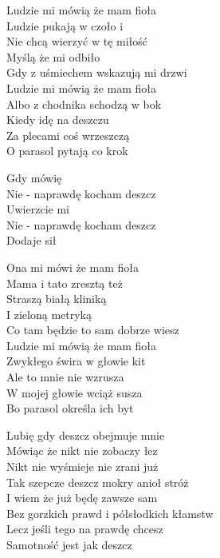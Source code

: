 \begin{text}
    Ludzie mi mówią że mam fioła\\
    Ludzie pukają w czoło i\\
    Nie chcą wierzyć w tę miłość\\
    Myślą że mi odbiło\\
    Gdy z uśmiechem wskazują mi drzwi\\
    Ludzie mi mówią że mam fioła\\
    Albo z chodnika schodzą w bok\\
    Kiedy idę na deszczu\\
    Za plecami coś wrzeszczą\\
    O parasol pytają co krok

    Gdy mówię\\
    Nie - naprawdę kocham deszcz\\
    Uwierzcie mi\\
    Nie - naprawdę kocham deszcz\\
    Dodaje sił

    Ona mi mówi że mam fioła\\
    Mama i tato zresztą też\\
    Straszą białą kliniką\\
    I zieloną metryką\\
    Co tam będzie to sam dobrze wiesz\\
    Ludzie mi mówią że mam fioła\\
    Zwykłego świra w głowie kit\\
    Ale to mnie nie wzrusza\\
    W mojej głowie wciąż susza\\
    Bo parasol określa ich byt

    Lubię gdy deszcz obejmuje mnie\\
    Mówiąc że nikt nie zobaczy łez\\
    Nikt nie wyśmieje nie zrani już\\
    Tak szepcze deszcz mokry anioł stróż\\
    I wiem że już będę zawsze sam\\
    Bez gorzkich prawd i półsłodkich kłamstw\\
    Lecz jeśli tego na prawdę chcesz\\
    Samotność jest jak deszcz
\end{text}
\begin{chord}

\end{chord}